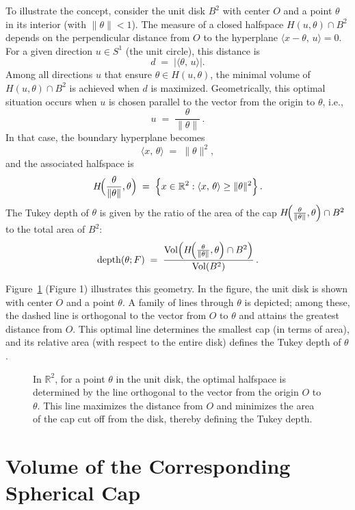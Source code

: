 To illustrate the concept, consider the unit disk \(B^2\) with center \(O\) and a point \(\theta\) in its interior (with \(\|\theta\| < 1\)). The measure of a closed halfspace \(H(u,\theta)\cap B^2\) depends on the perpendicular distance from \(O\) to the hyperplane \(\langle x-\theta,\,u\rangle = 0\). For a given direction \(u \in S^1\) (the unit circle), this distance is
\[
d \;=\; |\langle \theta,\,u\rangle|.
\]
Among all directions \(u\) that ensure \(\theta\in H(u,\theta)\), the minimal volume of \(H(u,\theta)\cap B^2\) is achieved when \(d\) is maximized. Geometrically, this optimal situation occurs when \(u\) is chosen parallel to the vector from the origin to \(\theta\), i.e.,
\[
u \;=\; \frac{\theta}{\|\theta\|}\,.
\]
In that case, the boundary hyperplane becomes
\[
\langle x,\,\theta\rangle \;=\; \|\theta\|^2,
\]
and the associated halfspace is
\[
H\!\Bigl(\frac{\theta}{\|\theta\|},\theta\Bigr)
\;=\;
\Bigl\{ x \in \mathbb{R}^2 : \langle x,\,\theta\rangle \ge \|\theta\|^2 \Bigr\}\,.
\]
The Tukey depth of \(\theta\) is given by the ratio of the area of the cap \(H\!\Bigl(\frac{\theta}{\|\theta\|},\theta\Bigr)\cap B^2\) to the total area of \(B^2\):
\[
\mathrm{depth}(\theta;F)
\;=\;
\frac{\mathrm{Vol}\Bigl(H\!\Bigl(\frac{\theta}{\|\theta\|},\theta\Bigr)\cap B^2\Bigr)}{\mathrm{Vol}(B^2)}\,.
\]

\noindent Figure~\ref{fig:tukey-depth-2D} (Figure 1) illustrates this geometry. In the figure, the unit disk is shown with center \(O\) and a point \(\theta\). A family of lines through \(\theta\) is depicted; among these, the dashed line is orthogonal to the vector from \(O\) to \(\theta\) and attains the greatest distance from \(O\). This optimal line determines the smallest cap (in terms of area), and its relative area (with respect to the entire disk) defines the Tukey depth of \(\theta\).

\begin{figure}[ht]
  \centering
  \caption{In \(\mathbb{R}^2\), for a point \(\theta\) in the unit disk, the optimal halfspace is determined by the line orthogonal to the vector from the origin \(O\) to \(\theta\). This line maximizes the distance from \(O\) and minimizes the area of the cap cut off from the disk, thereby defining the Tukey depth.}
  \label{fig:tukey-depth-2D}
\end{figure}


\section{Volume of the Corresponding Spherical Cap}


